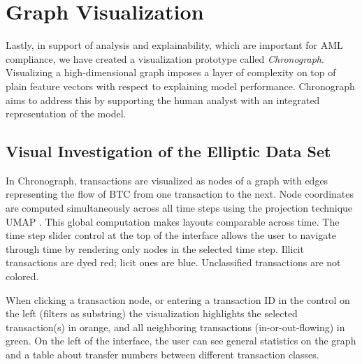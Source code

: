 \documentclass[sigconf,submission]{acmart}
\begin{document}


\section{Graph Visualization}
Lastly, in support of analysis and explainability, which are important for AML compliance, we have created a visualization prototype called \emph{Chronograph}. Visualizing a high-dimensional graph imposes a layer of complexity on top of plain feature vectors with respect to explaining model performance. Chronograph aims to address this by supporting the human analyst with an integrated representation of the model.

\subsection{Visual Investigation of the Elliptic Data Set}

In Chronograph, transactions are visualized as nodes of a graph with edges representing the flow of BTC from one transaction to the next. Node coordinates are computed simultaneously across all time steps using the projection technique UMAP \cite{mcinnes2018umap}. This global computation makes layouts comparable across time. The time step slider control at the top of the interface allows the user to navigate through time by rendering only nodes in the selected time step. Illicit transactions are dyed red; licit ones are blue. Unclassified transactions are not colored.

When clicking a transaction node, or entering a transaction ID in the control on the left (filters as substring) the visualization highlights the selected transaction(s) in orange, and all neighboring transactions (in-or-out-flowing) in green. On the left of the interface, the user can see general statistics on the graph and a table about transfer numbers between different transaction classes.
\end{document}
